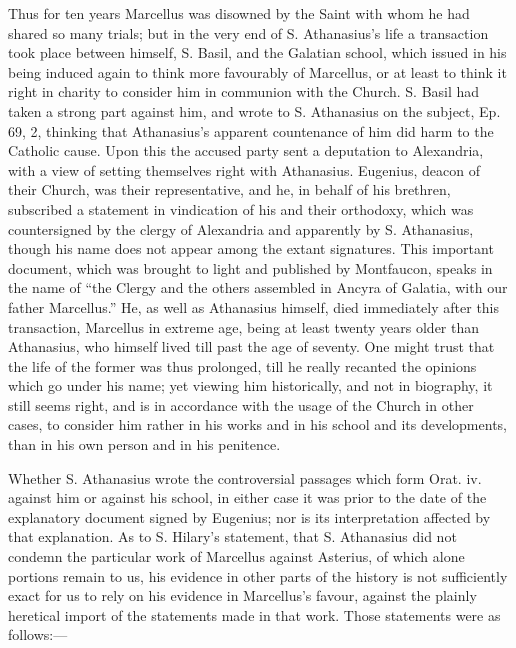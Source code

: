 Thus for ten years Marcellus was disowned by the
Saint with whom he had shared so many trials; but in the very end of
S. Athanasius's life a transaction took place between himself, S.
Basil, and the Galatian school, which issued in his being induced
again to think more favourably of Marcellus, or at least to think it
right in charity to consider him in communion with the Church. S.
Basil had taken a strong part against him, and wrote to S. Athanasius
on the subject, Ep. 69, 2, thinking that Athanasius's apparent
countenance of him did harm to the Catholic cause. Upon this the
accused party sent a deputation to Alexandria, with a view of setting
themselves right with Athanasius. Eugenius, deacon of their Church,
was their representative, and he, in behalf of his brethren,
subscribed a statement in vindication of his and their
orthodoxy, which was countersigned by the clergy of Alexandria and
apparently by S. Athanasius, though his name does not appear among the
extant signatures. This important document, which was brought to light
and published by Montfaucon, speaks in the name of ``the Clergy and the
others assembled in Ancyra of Galatia, with our father Marcellus.'' He,
as well as Athanasius himself, died immediately after this
transaction, Marcellus in extreme age, being at least twenty years
older than Athanasius, who himself lived till past the age of seventy.
One might trust that the life of the former was thus prolonged, till
he really recanted the opinions which go under his name; yet viewing
him historically, and not in biography, it still seems right, and is
in accordance with the usage of the Church in other cases, to consider
him rather in his works and in his school and its developments, than
in his own person and in his penitence.

Whether S. Athanasius wrote the controversial
passages which form Orat. iv. against him or against his school, in
either case it was prior to the date of the explanatory document
signed by Eugenius; nor is its interpretation affected by that
explanation. As to S. Hilary's statement, that S. Athanasius did not
condemn the particular work of Marcellus against Asterius, of which
alone portions remain to us, his evidence in other parts of the
history is not sufficiently exact for us to rely on his evidence in
Marcellus's favour, against the plainly heretical import of the
statements made in that work. Those statements were as follows:—

